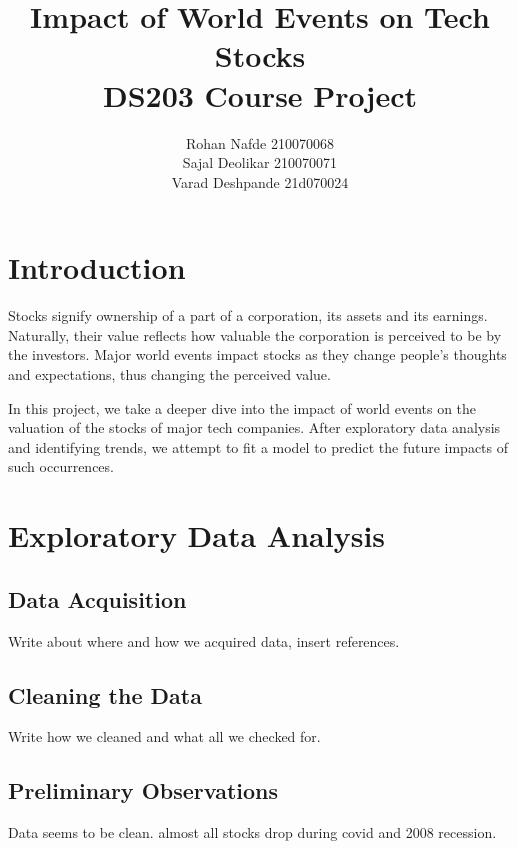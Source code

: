 \documentclass[11pt, twocolumn]{article}
\title{
Impact of World Events on Tech Stocks \\
DS203 Course Project
}
\author{Rohan Nafde 210070068\\
Sajal Deolikar 210070071\\
Varad Deshpande 21d070024}
\date{}
\begin{document}
\maketitle

\begin{justify}

\section*{\large Introduction}\label{sec:intro}

\vspace{-5pt}

Stocks signify ownership of a part of a corporation, its assets and its earnings.
Naturally, their value reflects how valuable the corporation is perceived to be by the investors.
Major world events impact stocks as they change people's thoughts and expectations, thus changing 
the perceived value.
\vspace{1em}

In this project, we take a deeper dive into the impact of world events on the valuation of the stocks
of major tech companies. After exploratory data analysis and identifying trends, we attempt to fit a 
model to predict the future impacts of such occurrences.


\section{\large Exploratory Data Analysis}\label{sec:eda}

\vspace{-5pt}

\subsection{Data Acquisition}
Write about where and how we acquired data, insert references.
\vspace{-5pt}
\subsection{Cleaning the Data} 
Write how we cleaned and what all we checked for.
\vspace{-5pt}
\subsection{Preliminary Observations}
Data seems to be clean.
almost all stocks drop during covid and 2008 recession.




\end{justify}
\end{document}
